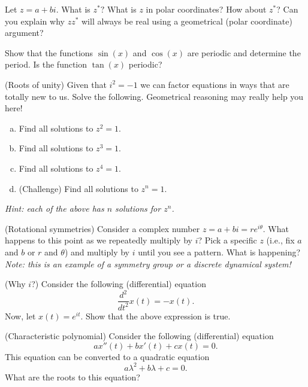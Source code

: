 \documentclass[12pt]{article} %
\begin{document}
\begin{problem}
Let $z=a+bi$.  What is $z^*?$  What is $z$ in polar coordinates? How about $z^*$? Can you explain why $zz^*$ will always be real using a geometrical (polar coordinate) argument?
\end{problem}

\begin{problem}
Show that the functions $\sin(x)$ and $\cos(x)$ are periodic and determine the period.  Is the function $\tan(x)$ periodic?
\end{problem}

\begin{problem}
(Roots of unity) Given that $i^2=-1$ we can factor equations in ways that are totally new to us.  Solve the following. Geometrical reasoning may really help you here!
\begin{enumerate}[(a)]
    \item Find all solutions to $z^2=1$.
    \item Find all solutions to $z^3=1$.
    \item Find all solutions to $z^4=1$.
    \item (Challenge) Find all solutions to $z^n=1$.
\end{enumerate}
\emph{Hint: each of the above has $n$ solutions for $z^n$.}
\end{problem}

\begin{problem}
(Rotational symmetries) Consider a complex number $z=a+bi=re^{i\theta}$. What happens to this point as we repeatedly multiply by $i$? Pick a specific $z$ (i.e., fix $a$ and $b$ or $r$ and $\theta$) and multiply by $i$ until you see a pattern.  What is happening? \emph{Note: this is an example of a symmetry group or a discrete dynamical system!}
\end{problem}

\begin{problem}
(Why $i$?) Consider the following (differential) equation
\[
\frac{d^2}{dt^2}x(t)=-x(t).
\]
Now, let $x(t)=e^{it}$.  Show that the above expression is true.
\end{problem}

\begin{problem}
(Characteristic polynomial) Consider the following (differential) equation
\[
ax''(t)+bx'(t)+cx(t)=0.
\]
This equation can be converted to a quadratic equation
\[
a\lambda^2 + b\lambda + c = 0.
\]
What are the roots to this equation?
\end{problem}
\end{document}
